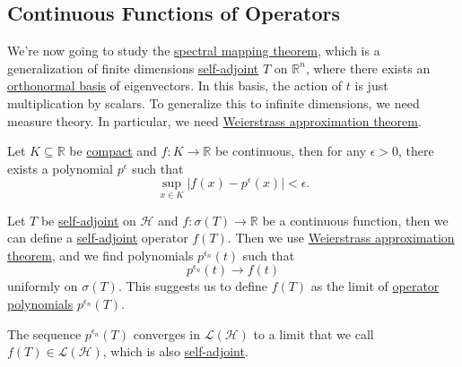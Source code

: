 \subsection{Continuous Functions of Operators}
We're now going to study the \hyperref[thm:spectral-mapping]{spectral mapping theorem}, which is a generalization of finite dimensions \hyperref[def:self-adjoint-op]{self-adjoint} \(T\) on \(\mathbb{R} ^n\), where there exists an \hyperref[def:orthonormal-basis]{orthonormal basis} of eigenvectors. In this basis, the action of \(t\) is just multiplication by scalars. To generalize this to infinite dimensions, we need measure theory. In particular, we need \hyperref[thm:Weierstrass-approximation]{Weierstrass approximation theorem}.

\begin{theorem}\label{thm:Weierstrass-approximation}
	Let \(K \subseteq \mathbb{R} \) be \hyperref[def:compact]{compact} and \(f\colon K \to \mathbb{R} \) be continuous, then for any \(\epsilon > 0\), there exists a polynomial \(p^{\epsilon } \) such that
	\[
		\sup_{x\in K} \vert f(x) - p^{\epsilon }(x)  \vert < \epsilon .
	\]
\end{theorem}

Let \(T\) be \hyperref[def:self-adjoint-op]{self-adjoint} on \(\mathcal{H} \) and \(f\colon \sigma (T) \to \mathbb{R} \) be a continuous function, then we can define a \hyperref[def:self-adjoint-op]{self-adjoint} operator \(f(T)\). Then we use \hyperref[thm:Weierstrass-approximation]{Weierstrass approximation theorem}, and we find polynomials \(p^{\epsilon _n}(t)\) such that
\[
	p^{\epsilon _n}(t) \to f(t)
\]
uniformly on \(\sigma (T)\). This suggests us to define \(f(T)\) as the limit of \hyperref[def:polynomial-op]{operator polynomials} \(p^{\epsilon _n}(T)\).

\begin{definition}\label{def:continuous-function-op}
	The sequence \(p^{\epsilon _n}(T)\) converges in \(\mathcal{L} (\mathcal{H} )\) to a limit that we call \(f(T)\in \mathcal{L} (\mathcal{H} )\), which is also \hyperref[def:self-adjoint-op]{self-adjoint}.
\end{definition}

